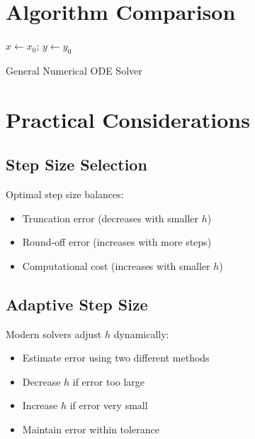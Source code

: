 \documentclass[12pt]{article}
\begin{document}
\section{Algorithm Comparison}

\begin{algorithm}[H]
\SetAlgoLined
{}
$x \leftarrow x_{0}$; $y \leftarrow y_{0}$\;
\caption{General Numerical ODE Solver}
\end{algorithm}

\section{Practical Considerations}

\subsection{Step Size Selection}

\begin{keypoint}
Optimal step size balances:
\begin{itemize}
\item Truncation error (decreases with smaller $h$)
\item Round-off error (increases with more steps)
\item Computational cost (increases with smaller $h$)
\end{itemize}
\end{keypoint}

\subsection{Adaptive Step Size}

\begin{insight}
Modern solvers adjust $h$ dynamically:
\begin{itemize}
\item Estimate error using two different methods
\item Decrease $h$ if error too large
\item Increase $h$ if error very small
\item Maintain error within tolerance
\end{itemize}
\end{insight}
\end{document}
